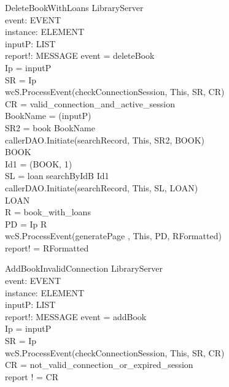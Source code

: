 \begin{schema}{DeleteBookWithLoans}
\Delta LibraryServer \\
event: EVENT \\
instance: ELEMENT \\
inputP: LIST \\
report!: MESSAGE
\where event = deleteBook \\
Ip = \head inputP \\
SR = \lseq Ip \rseq \\ 
wcS.ProcessEvent(checkConnectionSession, This, SR, CR) \\
CR = valid\_connection\_and\_active\_session \\
BookName = \head (\tail inputP) \\
SR2 = \lseq book BookName \rseq \\
callerDAO.Initiate(searchRecord, This, SR2, BOOK) \\
BOOK \neq \emptyset \\
Id1 = \nth(\head BOOK, 1) \\
SL = \lseq loan searchByIdB Id1 \rseq \\
callerDAO.Initiate(searchRecord, This, SL, LOAN) \\
LOAN \neq \emptyset \\
R = book\_with\_loans \\
PD = \lseq Ip R \rseq \\
wcS.ProcessEvent(generatePage , This, PD, RFormatted) \\
report! = RFormatted 
\end{schema}


\begin{schema}{AddBookInvalidConnection}
\Xi LibraryServer \\
event: EVENT \\
instance: ELEMENT \\
inputP: LIST \\
report!: MESSAGE
\where event = addBook \\
Ip = \head inputP \\
SR = \lseq Ip \rseq \\ 
wcS.ProcessEvent(checkConnectionSession, This, SR, CR) \\
CR = not\_valid\_connection\_or\_expired\_session \\ 
report ! = CR
\end{schema}

